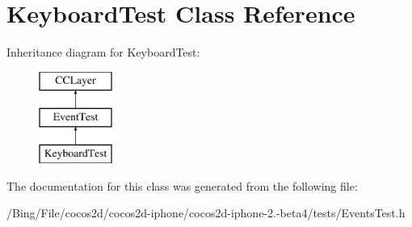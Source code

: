 \hypertarget{interface_keyboard_test}{\section{Keyboard\-Test Class Reference}
\label{interface_keyboard_test}
}
Inheritance diagram for Keyboard\-Test\-:\begin{figure}[H]
\begin{center}
\leavevmode
\includegraphics[height=3.000000cm]{interface_keyboard_test}
\end{center}
\end{figure}


The documentation for this class was generated from the following file\-:\begin{DoxyCompactItemize}
\item 
/\-Bing/\-File/cocos2d/cocos2d-\/iphone/cocos2d-\/iphone-\/2.-\/beta4/tests/Events\-Test.\-h\end{DoxyCompactItemize}

